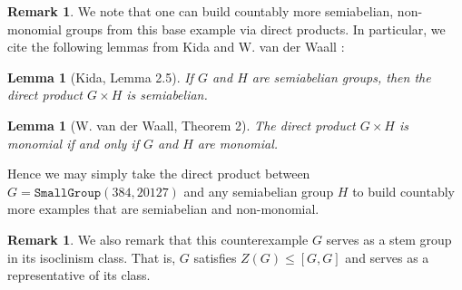 \documentclass[11pt]{article}
\newtheorem{lem}[thm]{Lemma}
\theoremstyle{definition}
\newtheorem{rem}[thm]{Remark}
\numberwithin{equation}{section}
\begin{document}
\begin{humanblock}
\begin{rem}
We note that one can build countably more semiabelian, non-monomial groups from this base example via direct products. In particular, we cite the following lemmas from Kida \cite{Kida25} and W. van der Waall \cite{vdWaall88}: 

\begin{lem}[Kida, Lemma 2.5]
    If $G$ and $H$ are semiabelian groups, then the direct product $G \times H$ is semiabelian. 
\end{lem}

\begin{lem}[W. van der Waall, Theorem 2]
The direct product $G \times H$ is monomial if and only if $G$ and $H$ are monomial. 
\end{lem}


Hence we may simply take the direct product between $G = \texttt{SmallGroup}(384,20127)$ and any semiabelian group $H$ to build countably more examples that are semiabelian and non-monomial.
\end{rem}

\begin{rem}
We also remark that this counterexample $G$ serves as a stem group in its isoclinism class. That is, $G$ satisfies $Z(G) \leq [G,G]$ and serves as a representative of its class.
\end{rem}
\end{humanblock}
\end{document}
